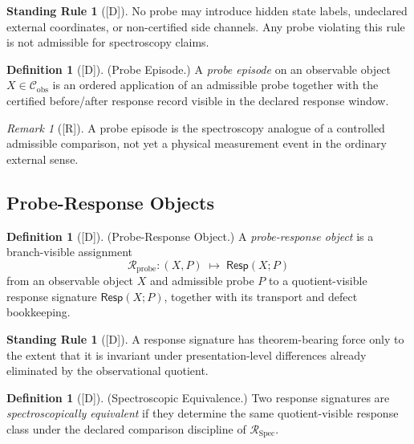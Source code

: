 \documentclass[12pt,oneside]{amsbook}
\theoremstyle{plain}
\theoremstyle{definition}
\newtheorem{definition}[theorem]{Definition}
\newtheorem{standingrule}[theorem]{Standing Rule}
\theoremstyle{remark}
\newtheorem{remark}[theorem]{Remark}
\newcommand{\status}[1]{\textup{[#1]}}
\begin{document}
\begin{standingrule}[\status{D}]\label{sr:spec-no-hidden-probe}
No probe may introduce hidden state labels, undeclared external coordinates,
or non-certified side channels. Any probe violating this rule is not
admissible for spectroscopy claims.
\end{standingrule}

\begin{definition}[\status{D}]\label{def:probe-episode}
\textup{(Probe Episode.)}
A \emph{probe episode} on an observable object $X \in \mathcal{C}_{\mathrm{obs}}$
is an ordered application of an admissible probe together with the certified
before/after response record visible in the declared response window.
\end{definition}

\begin{remark}[\status{R}]\label{rem:probe-episode-note}
A probe episode is the spectroscopy analogue of a controlled admissible
comparison, not yet a physical measurement event in the ordinary external
sense.
\end{remark}

\subsection{Probe-Response Objects}\label{sec:spec-probe-response}

\begin{definition}[\status{D}]\label{def:probe-response-object}
\textup{(Probe-Response Object.)}
A \emph{probe-response object} is a branch-visible assignment
\[
 \mathcal{R}_{\mathrm{probe}} : (X, P) \;\mapsto\; \mathsf{Resp}(X;P)
\]
from an observable object $X$ and admissible probe $P$ to a
quotient-visible response signature $\mathsf{Resp}(X;P)$, together with
its transport and defect bookkeeping.
\end{definition}

\begin{standingrule}[\status{D}]\label{sr:spec-response-invariance}
A response signature has theorem-bearing force only to the extent that it
is invariant under presentation-level differences already eliminated by the
observational quotient.
\end{standingrule}

\begin{definition}[\status{D}]\label{def:spectroscopic-equivalence}
\textup{(Spectroscopic Equivalence.)}
Two response signatures are \emph{spectroscopically equivalent} if they
determine the same quotient-visible response class under the declared
comparison discipline of $\mathcal{R}_{\mathrm{Spec}}$.
\end{definition}
\end{document}
